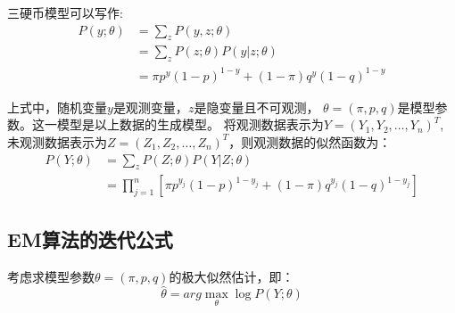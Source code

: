 \documentclass[a4paper,12pt]{book}
\begin{document}
    三硬币模型可以写作:
    \begin{equation}
        \begin{split}
            P(y;\theta) &= \sum_z P(y,z;\theta)\\ 
            &= \sum_z P(z;\theta)P(y|z;\theta) \\
            &=\pi p^y(1-p)^{1-y}+(1-\pi)q^y(1-q)^{1-y}
        \end{split}
    \end{equation}

    上式中，随机变量$y$是观测变量，$z$是隐变量且不可观测，
    $\theta = (\pi, p, q)$是模型参数。这一模型是以上数据的生成模型。
    将观测数据表示为$Y=(Y_1,Y_2,\dots,Y_n)^T$, 
    未观测数据表示为$Z=(Z_1,Z_2, \dots, Z_n)^T$，则观测数据的似然函数为：
    \begin{equation}
        \begin{split}
            P(Y;\theta) &=  \sum_z P(Z;\theta)P(Y|Z;\theta) \\
            &=\prod_{j=1}^n[\pi p^{y_j}(1-p)^{1-{y_j}}+(1-\pi)q^{y_j}(1-q)^{1-{y_j}}]
        \end{split}
    \end{equation}

    \subsection{EM算法的迭代公式}
    考虑求模型参数$\theta = (\pi, p, q)$的极大似然估计，即：
    \begin{equation}
        \hat{\theta} = arg \max_\theta \log P(Y;\theta)
    \end{equation}
\end{document}
